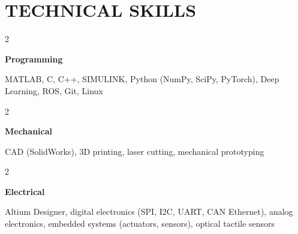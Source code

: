 
\newenvironment{twohalfcolentry}[2]{
    \setcolumnwidth{2.5cm, \fill} %
    \begin{paracol}{2}
    {\raggedright #1} \switchcolumn
}{
    \raggedright 
    \end{paracol}
} %


\section{\textbf{TECHNICAL SKILLS}}
    \begin{twohalfcolentry}{\textbf{Programming}} 
        \item MATLAB, C, C++, SIMULINK, Python (NumPy, SciPy, PyTorch), Deep Learning, ROS, Git, Linux
    \end{twohalfcolentry}
    \begin{twohalfcolentry}{\textbf{Mechanical}}
        \item CAD (SolidWorks), 3D printing, laser cutting, mechanical prototyping
    \end{twohalfcolentry}
    \begin{twohalfcolentry}{\textbf{Electrical}}
        \item Altium Designer, digital electronics (SPI, I2C, UART, CAN Ethernet), analog electronics, embedded systems (actuators, sensors), optical tactile sensors
    \end{twohalfcolentry}
